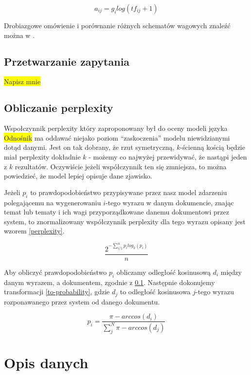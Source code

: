 \documentclass[11pt,a4paper]{article}
\newcommand{\todo}[1]{\colorbox{yellow}{#1}}
\begin{document}
\begin{equation}
  \label{eq:log-entr-end}
  a_{ij} = g_i log(tf_{ij} + 1)
\end{equation}

Drobiazgowe omówienie i porównanie różnych schematów wagowych znaleźć moż\-na w
\cite{figiel}.

\subsection{Przetwarzanie zapytania}
\label{processing}
\todo{Napisz mnie}

\subsection{Obliczanie perplexity}

Wspołczynnik perplexity który zaproponowany był do oceny modeli języka
\todo{Odnośnik} ma oddawać niejako poziom ``zaskoczenia'' modelu niewidzianymi
dotąd danymi. Jest on tak dobrany, że rzut symetryczną, $k$-ścienną kością
będzie miał perplexity dokładnie $k$ - możemy co najwyżej przewidywać, że
nastąpi jeden z $k$ rezultatów. Oczywiście jeżeli współczynnik ten się
zmniejsza, to można powiedzieć, że model lepiej opisuje dane zjawisko.

Jeżeli $p_i$ to prawdopodobieństwo przypisywane przez nasz model zdarzeniu
polegającemu na wygenerowaniu $i$-tego wyrazu w danym dokumencie, znając temat
lub tematy i ich wagi przyporządkowane danemu dokumentowi przez system, to
znormalizowany współczynnik perplexity dla tego wyrazu opisany jest wzorem
\ref{perplexity}.

\begin{equation}
  \label{perplexity}
  \frac{2^{-\sum_{i/1}^n p_ilog_2(p_i)}}{n}
\end{equation}

Aby obliczyć prawdopodobieństwo $p_i$ obliczamy odległość kosinusową $d_i$
między danym wyrazem, a dokumentem, zgodnie z \ref{processing}. Następnie
dokonujemy transformacji \ref{to-probability}, gdzie $d_j$ to odległość
kosinusowa $j$-tego wyrazu rozponawanego przez system od danego dokumentu.

\begin{equation}
  \label{to-probability}
  p_i = \frac{\pi - arccos(d_i)}{\sum_j^N \pi - arccos(d_j)}
\end{equation}

\section{Opis danych}
\end{document}
